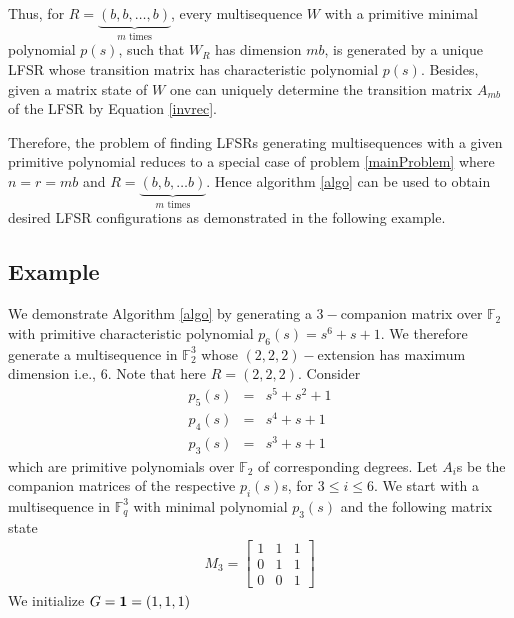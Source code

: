\documentclass[letterpaper, 12 pt]{article}  \usepackage{amssymb}
\newcommand{\F}{\mathbb{F}}
\begin{document}
Thus, for ${R}=\underbrace{(b,b,\ldots, b)}_{m \textrm{ times}}$, every
multisequence $W$ with a primitive minimal polynomial $p(s)$, such that $W_{R}$
has dimension $mb$, is generated by a unique LFSR whose transition matrix
has characteristic polynomial $p(s)$. Besides, given a matrix state of
 $W$ one can uniquely determine the transition
matrix $A_{mb}$ of the LFSR by Equation \eqref{invrec}.

Therefore, the problem of finding LFSRs generating multisequences with a given
primitive polynomial reduces to a special case of problem \ref{mainProblem}
where $n = r=
mb$ and ${R}=\underbrace{(b,b,\ldots b)}_{m \textrm{ times}}$. Hence algorithm
\ref{algo} can be used to obtain desired LFSR configurations as demonstrated in
the following example.

\subsection{Example}
We demonstrate Algorithm \ref{algo} by generating a $3-$companion matrix over $\F_2$ with primitive characteristic polynomial $p_6(s) = s^6 +s +1$. We therefore generate a multisequence in $\F_2^3$ whose
$(2,2,2)-$extension has maximum dimension i.e., $6$. Note that here $R = (2,2,2)$. Consider
\begin{eqnarray*}
 p_5(s) &=& s^5 + s^2 + 1\\
 p_4(s) &=& s^4 + s +1\\
 p_3(s) &=& s^3 + s+1
\end{eqnarray*} which are primitive polynomials over $\F_2$ of corresponding degrees. Let $A_i$s be the companion matrices of the respective $p_i(s)$s, for $3\leq i\leq 6$. 
We start with a multisequence in $\F_q^3$ with minimal polynomial $p_3(s)$ and the following matrix state
\begin{eqnarray*}
 M_3 = \left[\begin{matrix}
  1 & 1 & 1\\
  0 & 1 & 1\\
  0 & 0 & 1 
 \end{matrix}
\right]
\end{eqnarray*}
We initialize $G={\bf
1} = (1,1,1)$
\end{document}
